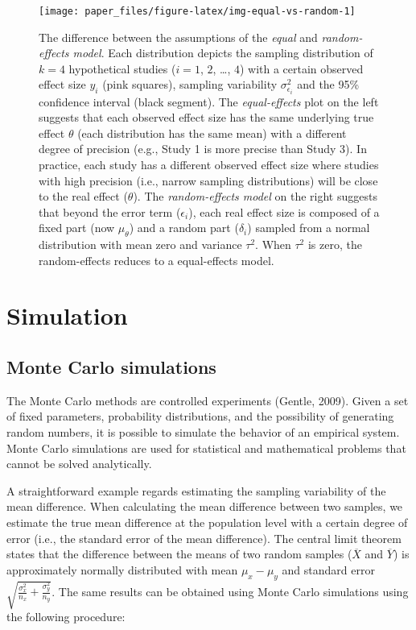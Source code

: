 \documentclass[
  man,floatsintext]{apa6}
\begin{document}
\begin{figure}[H]

{\centering \texttt{[image: paper\_files/figure-latex/img-equal-vs-random-1]} 

}

\caption{The difference between the assumptions of the \emph{equal} and \emph{random-effects model}. Each distribution depicts the sampling distribution of \(k = 4\) hypothetical studies (\(i = 1\), \(2\), \ldots, \(4\)) with a certain observed effect size \(y_{i}\) (pink squares), sampling variability \(\sigma_{\epsilon_i}^{2}\) and the 95\% confidence interval (black segment). The \emph{equal-effects} plot on the left suggests that each observed effect size has the same underlying true effect \(\theta\) (each distribution has the same mean) with a different degree of precision (e.g., Study 1 is more precise than Study 3). In practice, each study has a different observed effect size where studies with high precision (i.e., narrow sampling distributions) will be close to the real effect (\(\theta\)). The \emph{random-effects model} on the right suggests that beyond the error term (\(\epsilon_{i}\)), each real effect size is composed of a fixed part (now \(\mu_{\theta}\)) and a random part (\(\delta_{i}\)) sampled from a normal distribution with mean zero and variance \(\tau^{2}\). When \(\tau^{2}\) is zero, the random-effects reduces to a equal-effects model.}\label{fig:img-equal-vs-random}
\end{figure}

\normalsize

\hypertarget{simulation}{%
\section{Simulation}\label{simulation}}

\hypertarget{monte-carlo-simulations}{%
\subsection{Monte Carlo simulations}\label{monte-carlo-simulations}}

The Monte Carlo methods are controlled experiments (Gentle, 2009). Given a set of fixed parameters, probability distributions, and the possibility of generating random numbers, it is possible to simulate the behavior of an empirical system. Monte Carlo simulations are used for statistical and mathematical problems that cannot be solved analytically.

A straightforward example regards estimating the sampling variability of the mean difference. When calculating the mean difference between two samples, we estimate the true mean difference at the population level with a certain degree of error (i.e., the standard error of the mean difference). The central limit theorem states that the difference between the means of two random samples (\(\overline{X}\) and \(\overline{Y}\)) is approximately normally distributed with mean \(\mu_{x} - \mu_{y}\) and standard error \(\sqrt{\frac{\sigma^2_x}{{n_x}} + \frac{\sigma^2_y}{{n_y}}}\). The same results can be obtained using Monte Carlo simulations using the following procedure:
\end{document}

